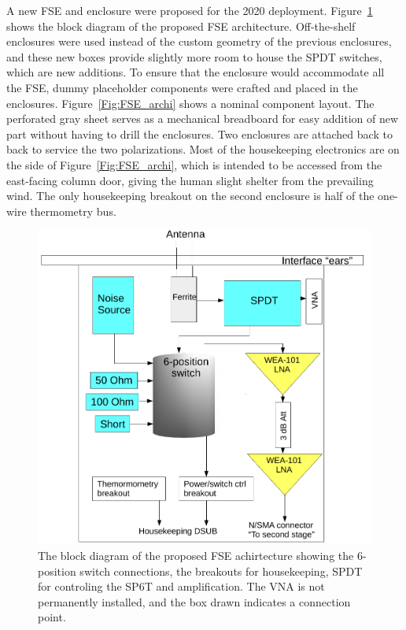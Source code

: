 A new FSE and enclosure were proposed for the 2020 deployment. Figure~\ref{Fig:FSE_rev} shows the block diagram of the proposed FSE architecture. Off-the-shelf enclosures were used instead of the custom geometry of the previous enclosures, and these new boxes provide slightly more room to house the SPDT switches, which are new additions. To ensure that the enclosure would accommodate all the FSE, dummy placeholder components were crafted and placed in the enclosures. Figure~\ref{Fig:FSE_archi} shows a nominal component layout. The perforated gray sheet serves as a mechanical breadboard for easy addition of new part without having to drill the enclosures. Two enclosures are attached back to back to service the two polarizations. Most of the housekeeping electronics are on the side of Figure~\ref{Fig:FSE_archi}, which is intended to be accessed from the east-facing column door, giving the human slight shelter from the prevailing wind. The only housekeeping breakout on the second enclosure is half of the one-wire thermometry bus.

\begin{figure}
	\centering
	\includegraphics[width=0.7\linewidth]{Figures/FSE_rev}
	\caption{The block diagram of the proposed FSE achirtecture showing the 6-position switch connections, the breakouts for housekeeping, SPDT for controling the SP6T and amplification. The VNA is not permanently installed, and the box drawn indicates a connection point.}
	\label{Fig:FSE_rev}
\end{figure} 

